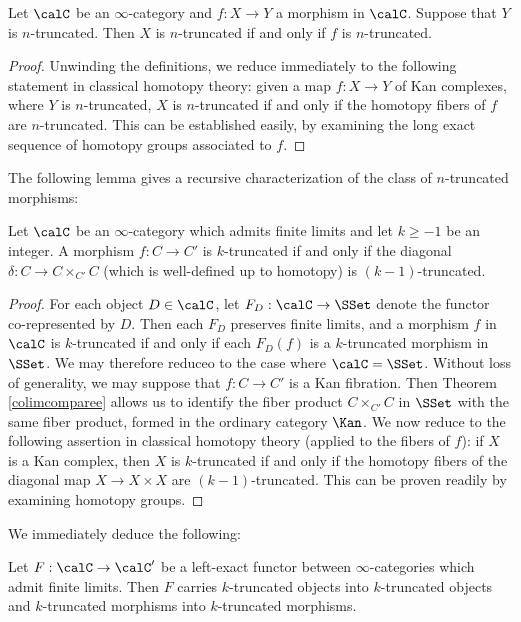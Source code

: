 \begin{lemma}\label{trunccomp}
Let $\calC$ be an $\infty$-category and $f: X \rightarrow Y$ a morphism in $\calC$.
Suppose that $Y$ is $n$-truncated. Then $X$ is $n$-truncated if and only if $f$ is $n$-truncated.
\end{lemma}

\begin{proof}
Unwinding the definitions, we reduce immediately to the following statement in classical homotopy theory: given a map $f: X \rightarrow Y$ of Kan complexes, where $Y$ is $n$-truncated, $X$ is $n$-truncated if and only if the homotopy fibers of $f$ are $n$-truncated. This can be established easily, by examining the long exact sequence of homotopy groups associated to $f$.
\end{proof}

The following lemma gives a recursive characterization of the class of $n$-truncated morphisms:

\begin{lemma}\label{trunc}
Let $\calC$ be an $\infty$-category which admits finite limits and let $k
\geq -1$ be an integer. A morphism $f: C \rightarrow C'$ is $k$-truncated if and
only if the diagonal $\delta: C \rightarrow C \times_{C'} C$ (which is well-defined up to homotopy)
is $(k-1)$-truncated.
\end{lemma}

\begin{proof}
For each object $D \in \calC$, let $F_{D}: \calC \rightarrow \SSet$ denote the 
functor co-represented by $D$. Then each $F_{D}$ preserves finite limits, and
a morphism $f$ in $\calC$ is $k$-truncated if and only if each $F_D(f)$ is a $k$-truncated morphism in $\SSet$. We may therefore reduceo to the case where $\calC = \SSet$. Without loss of generality, we may suppose that $f: C \rightarrow C'$ is a Kan fibration. Then Theorem \ref{colimcomparee} allows us to identify the fiber product $C \times_{C'} C$ in $\SSet$ with the same fiber product, formed in the ordinary category $\Kan$. We now reduce to the following assertion in classical homotopy theory (applied to the fibers of $f$): if $X$ is a Kan complex, then $X$ is $k$-truncated if and only if the homotopy fibers of the diagonal map $X \rightarrow X \times X$ are $(k-1)$-truncated. This can be proven readily by examining homotopy groups.
\end{proof}

We immediately deduce the following:

\begin{proposition}\label{eaa}
Let $F: \calC \rightarrow \calC'$ be a left-exact functor between
$\infty$-categories which admit finite limits. Then $F$ carries
$k$-truncated objects into $k$-truncated objects and $k$-truncated
morphisms into $k$-truncated morphisms.
\end{proposition}


